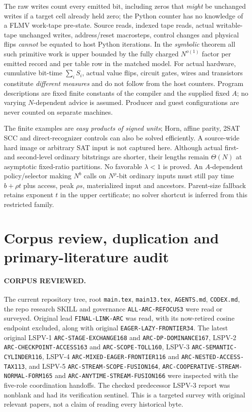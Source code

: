 \documentclass[11pt]{article}
\begin{document}
The raw writes count every emitted bit, including zeros that
\emph{might} be unchanged writes if a target cell already held zero;
the Python counter has no knowledge of a FLMV work-tape pre-state.
Source reads, indexed tape reads, actual writable-tape unchanged
writes, address/reset macrosteps, control changes and physical
flips \emph{cannot} be equated to host Python iterations.
In the \emph{symbolic} theorem all such primitive work is upper
bounded by the fully charged $N^{o(1)}$ factor per emitted record
and per table row in the matched model.
For actual hardware, cumulative bit-time
$\sum_i S_i$, actual value flips, circuit gates, wires and
transistors constitute \emph{different measures} and do not
follow from the host counters. Program descriptions are fixed
finite constants of the compiler and the supplied fixed $A$;
no varying $N$-dependent advice is assumed. Producer and guest
configurations are never counted on separate machines.

The finite examples are \emph{easy products of signed units};
Horn, affine parity, 2SAT SCC and direct-recognizer controls
can also be solved efficiently. A source-wide hard image or
arbitrary SAT input is not captured here.
Although actual first- and second-level ordinary bitstrings
are shorter, their lengths remain $\Theta(N)$ at asymptotic
fixed-ratio partitions. No favorable $\lambda<1$ is proved.
An $A$-dependent policy/selector making $N^b$ calls on
$N^\rho$-bit ordinary inputs must still pay
time $b+\rho t$ plus access, peak $\rho s$,
materialized input and ancestors. Parent-size fallback
retains exponent $t$ in the upper certificate;
no solver shortcut is inferred from this restricted family.

\section{Corpus review, duplication and primary-literature audit}
\paragraph{CORPUS REVIEWED.}
The current repository tree, root \texttt{main.tex},
\texttt{main13.tex}, \texttt{AGENTS.md}, \texttt{CODEX.md},
the repo research SKILL and governance
\texttt{ALL-ARC-REFOCUS3} were read or surveyed.
Original lead \texttt{FINAL-LINK-ARC} was read, with its
now-retired cosine endpoint excluded, along with original
\texttt{EAGER-LAZY-FRONTIER34}.
The latest original LSPV-1
\texttt{ARC-STAGE-EXCHANGE168} and
\texttt{ARC-DP-DOMINANCE167}, LSPV-2
\texttt{ARC-CHECKPOINT-ACCESS163} and
\texttt{ARC-SCOPE-TOLL160}, LSPV-3
\texttt{ARC-SEMANTIC-CYLINDER116}, LSPV-4
\texttt{ARC-MIXED-EAGER-FRONTIER116} and
\texttt{ARC-NESTED-ACCESS-TAX113}, and
LSPV-5 \texttt{ARC-STREAM-SCOPE-FUSION164},
\texttt{ARC-COOPERATIVE-STREAM-NORMAL-FORM165} and
\texttt{ARC-ANYTIME-STREAM-FUSION166} were inspected with
the five-role coordination handoffs. The checked predecessor
LSPV-3 report was nonblank and had its verification sentinel.
This is a targeted survey with original relevant papers,
not a claim of reading every historical byte.
\end{document}

